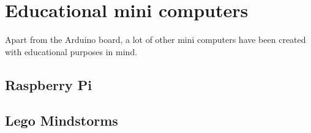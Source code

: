 \section{Educational mini computers}

Apart from the Arduino board, a lot of other mini computers have been created with educational purposes in mind.

\subsection{Raspberry Pi}

\subsection{Lego Mindstorms}
